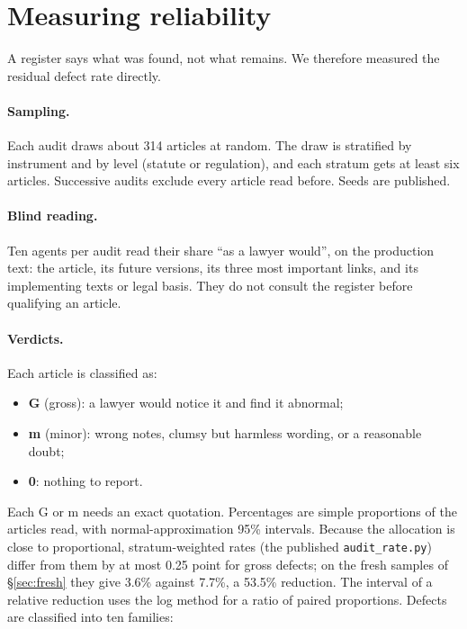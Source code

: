 \documentclass[11pt,a4paper]{article}
\begin{document}
\section{Measuring reliability}
\label{sec:measure}

A register says what was found, not what remains. We therefore measured the residual defect rate directly.

\paragraph{Sampling.}
Each audit draws about 314 articles at random. The draw is stratified by instrument and by level (statute or regulation), and each stratum gets at least six articles. Successive audits exclude every article read before. Seeds are published.

\paragraph{Blind reading.}
Ten agents per audit read their share ``as a lawyer would'', on the production text: the article, its future versions, its three most important links, and its implementing texts or legal basis. They do not consult the register before qualifying an article.

\paragraph{Verdicts.}
Each article is classified as:
\begin{itemize}
  \item \textbf{G} (gross): a lawyer would notice it and find it abnormal;
  \item \textbf{m} (minor): wrong notes, clumsy but harmless wording, or a reasonable doubt;
  \item \textbf{0}: nothing to report.
\end{itemize}
Each G or m needs an exact quotation. Percentages are simple proportions of the articles read, with normal-approximation 95\% intervals. Because the allocation is close to proportional, stratum-weighted rates (the published \texttt{audit\_rate.py}) differ from them by at most 0.25 point for gross defects; on the fresh samples of \S\ref{sec:fresh} they give 3.6\% against 7.7\%, a 53.5\% reduction. The interval of a relative reduction uses the log method for a ratio of paired proportions. Defects are classified into ten families:
\end{document}

